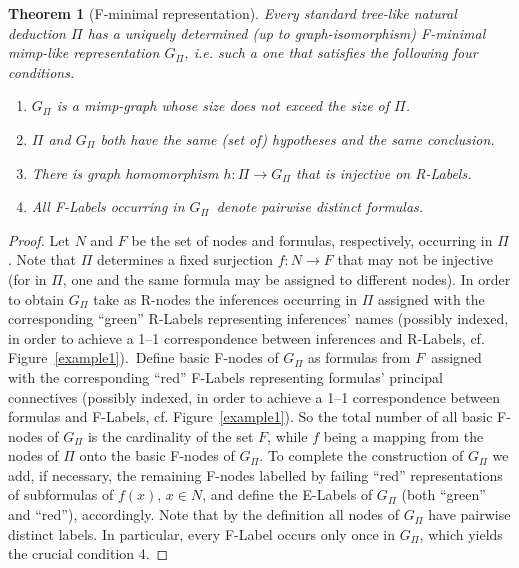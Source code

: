 \documentclass[submission,copyright,creativecommons]{eptcs}
\newtheorem{theorem}{Theorem}
\begin{document}
\begin{theorem}[F-minimal representation]\label{theo1}
Every standard tree-like natural deduction $\Pi $ has a uniquely
determined (up to graph-isomorphism) \emph{F-minimal mimp-like representation} $G_{\Pi }$, i.e. such a one that satisfies the following four conditions.

\begin{enumerate}
\item  $G_{\Pi }$ is a mimp-graph whose size does not exceed the size of $\Pi $.

\item  $\Pi $ and $G_{\Pi }$ both have the same (set of) hypotheses and the
same conclusion.

\item  There is graph homomorphism $h:\Pi \rightarrow G_{\Pi }$ that is
injective on R-Labels.

\item  All F-Labels occurring in $G_{\Pi }$\ denote pairwise distinct
formulas.
\end{enumerate}
\end{theorem}

\begin{proof}
Let $N$ and $F$ be the set of nodes and formulas, respectively, occurring in 
$\Pi $. Note that $\Pi $ determines a fixed surjection $f:N\rightarrow F$
that may not be injective (for in $\Pi $, one and the same formula may be
assigned to different nodes). In order to obtain $G_{\Pi }$ take as R-nodes
the inferences occurring in $\Pi $ assigned with the corresponding ``green''
R-Labels representing inferences' names (possibly indexed, in order to
achieve a 1--1 correspondence between inferences and R-Labels, cf. Figure~\ref{example1}).\ 
Define basic F-nodes of $G_{\Pi }$ as formulas from $F$\ assigned with
the corresponding ``red'' F-Labels representing formulas' principal
connectives (possibly indexed, in order to achieve a 1--1 correspondence
between formulas and F-Labels, cf. Figure~\ref{example1}). So the total number of all
basic F-nodes of $G_{\Pi }$ is the cardinality of the set $F$, while $f$
being a mapping from the nodes of $\Pi $ onto the basic F-nodes of $G_{\Pi }$. To complete the construction of $G_{\Pi }$ we add, if necessary, the
remaining F-nodes labelled by failing ``red'' representations of subformulas
of $f(x)$, $x\in N$, and define the E-Labels of $G_{\Pi }$ (both ``green''
and ``red''), accordingly. Note that by the definition all nodes of $G_{\Pi }
$ have pairwise distinct labels. In particular, every F-Label occurs only
once in $G_{\Pi }$, which yields the crucial condition 4.
\end{proof}
\end{document}
